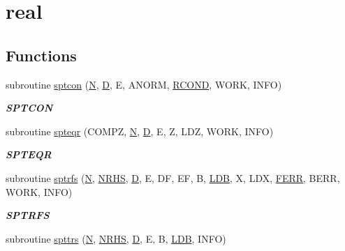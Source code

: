\hypertarget{group__realPTcomputational}{}\section{real}
\label{group__realPTcomputational}
\subsection*{Functions}
\begin{DoxyCompactItemize}
\item 
subroutine \hyperlink{group__realPTcomputational_gabc37c4284bea6237d5f0f08d27d3ebdd}{sptcon} (\hyperlink{polmisc_8c_a0240ac851181b84ac374872dc5434ee4}{N}, \hyperlink{odrpack_8h_a7dae6ea403d00f3687f24a874e67d139}{D}, E, A\+N\+O\+R\+M, \hyperlink{superlu__enum__consts_8h_af00a42ecad444bbda75cde1b64bd7e72a9b5c151728d8512307565994c89919d5}{R\+C\+O\+N\+D}, W\+O\+R\+K, I\+N\+F\+O)
\begin{DoxyCompactList}\small\item\em {\bfseries S\+P\+T\+C\+O\+N} \end{DoxyCompactList}\item 
subroutine \hyperlink{group__realPTcomputational_ga72b5ecbbf9359796ae9368a141d2540c}{spteqr} (C\+O\+M\+P\+Z, \hyperlink{polmisc_8c_a0240ac851181b84ac374872dc5434ee4}{N}, \hyperlink{odrpack_8h_a7dae6ea403d00f3687f24a874e67d139}{D}, E, Z, L\+D\+Z, W\+O\+R\+K, I\+N\+F\+O)
\begin{DoxyCompactList}\small\item\em {\bfseries S\+P\+T\+E\+Q\+R} \end{DoxyCompactList}\item 
subroutine \hyperlink{group__realPTcomputational_gabac73ddf5a5f2328168722803d277dd0}{sptrfs} (\hyperlink{polmisc_8c_a0240ac851181b84ac374872dc5434ee4}{N}, \hyperlink{example__user_8c_aa0138da002ce2a90360df2f521eb3198}{N\+R\+H\+S}, \hyperlink{odrpack_8h_a7dae6ea403d00f3687f24a874e67d139}{D}, E, D\+F, E\+F, B, \hyperlink{example__user_8c_a50e90a7104df172b5a89a06c47fcca04}{L\+D\+B}, X, L\+D\+X, \hyperlink{superlu__enum__consts_8h_af00a42ecad444bbda75cde1b64bd7e72a78fd14d7abebae04095cfbe02928f153}{F\+E\+R\+R}, B\+E\+R\+R, W\+O\+R\+K, I\+N\+F\+O)
\begin{DoxyCompactList}\small\item\em {\bfseries S\+P\+T\+R\+F\+S} \end{DoxyCompactList}\item 
subroutine \hyperlink{group__realPTcomputational_gad3d24a8e0bd3c2341bed389633536d94}{spttrs} (\hyperlink{polmisc_8c_a0240ac851181b84ac374872dc5434ee4}{N}, \hyperlink{example__user_8c_aa0138da002ce2a90360df2f521eb3198}{N\+R\+H\+S}, \hyperlink{odrpack_8h_a7dae6ea403d00f3687f24a874e67d139}{D}, E, B, \hyperlink{example__user_8c_a50e90a7104df172b5a89a06c47fcca04}{L\+D\+B}, I\+N\+F\+O)

\end{DoxyCompactItemize}
